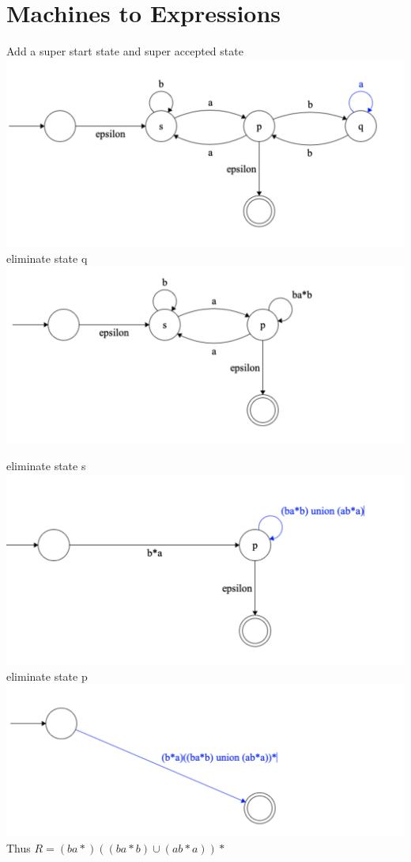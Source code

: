 \documentclass[12pt]{article}
\begin{document}
\section{Machines to Expressions}
Add a super start state and super accepted state\\
\includegraphics[scale = 0.5]{3}\\
eliminate state q\\
\includegraphics[scale = 0.5]{4}\\
\pagebreak

eliminate state s\\
\includegraphics[scale = 0.5]{5}\\
eliminate state p\\
\includegraphics[scale = 0.5]{6}\\
Thus $R = (ba*)((ba*b)\cup (ab*a))*$
\end{document}
